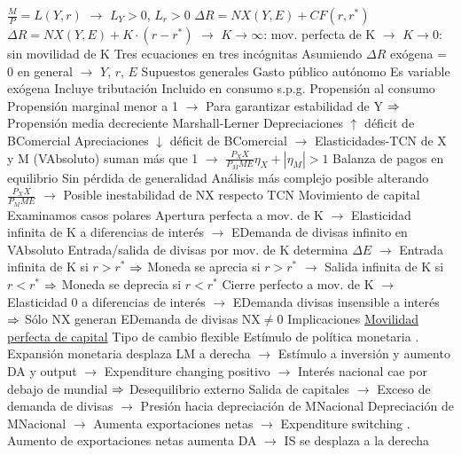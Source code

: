 \documentclass{nuevotema}
\begin{document}
\begin{esquemal}
				\4[LM] $\frac{M}{P} = L(Y,r)$
				\4[] $\to$ $L_Y > 0$, $L_r > 0$
				\4[BP] $\Delta R = NX(Y,E) + CF(r, r^*)$
				\4[] $\Delta R = NX(Y,E) + K \cdot (r- r^*)$
				\4[] $\to$ $K \to \infty$: mov. perfecta de K
				\4[] $\to$ $K \to 0$: sin movilidad de K
				\4 Tres ecuaciones en tres incógnitas
				\4[] Asumiendo $\Delta R$ exógena = 0 en general
				\4[] $\to$ $Y$, $r$, $E$
			\3 Supuestos generales
				\4 Gasto público autónomo
				\4[] Es variable exógena
				\4[] Incluye tributación
				\4[] Incluido en consumo s.p.g.
				\4 Propensión al consumo
				\4[] Propensión marginal menor a 1
				\4[] $\to$ Para garantizar estabilidad de Y
				\4[] $\Rightarrow$ Propensión media decreciente
				\4 Marshall-Lerner
				\4[] Depreciaciones $\uparrow$ déficit de BComercial
				\4[] Apreciaciones $\downarrow$ déficit de BComercial
				\4[] $\to$ Elasticidades-TCN de X y M (VAbsoluto) suman más que 1
				\4[] $\to$ $\frac{P_X X}{P_M M E} \eta_X + \left| \eta_M \right| > 1$
				\4 Balanza de pagos en equilibrio
				\4[] Sin pérdida de generalidad
				\4[] Análisis más complejo posible alterando $\frac{P_X X}{P_M M E}$
				\4[] $\to$ Posible inestabilidad de NX respecto TCN
				\4 Movimiento de capital
				\4[] Examinamos casos polares
				\4[] Apertura perfecta a mov. de K
				\4[] $\to$ Elasticidad infinita de K a diferencias de interés
				\4[] $\to$ EDemanda de divisas infinito en VAbsoluto
				\4[] Entrada/salida de divisas por mov. de K determina $\Delta E$
				\4[] $\to$ Entrada infinita de K si $r>r^*$
				\4[] $\Rightarrow$ Moneda se aprecia si $r > r^*$
				\4[] $\to$ Salida infinita de K si $r < r^*$
				\4[] $\Rightarrow$ Moneda se deprecia si $r < r^*$
				\4[] Cierre perfecto a mov. de K
				\4[] $\to$ Elasticidad 0 a diferencias de interés
				\4[] $\to$ EDemanda divisas insensible a interés
				\4[] $\Rightarrow$ Sólo NX generan EDemanda de divisas
				\4[] $\text{NX} \neq 0$
		\2 Implicaciones
			\3 \underline{Movilidad perfecta de capital}
			\3[] Tipo de cambio flexible
				\4 Estímulo de política monetaria
				. Expansión monetaria desplaza LM a derecha
				\4[] $\to$ Estímulo a inversión y aumento DA y output
				\4[] $\to$ Expenditure changing positivo
				\4[] $\to$ Interés nacional cae por debajo de mundial
				\4[] $\Rightarrow$ Desequilibrio externo
				\4[] Salida de capitales
				\4[] $\to$ Exceso de demanda de divisas
				\4[] $\to$ Presión hacia depreciación de MNacional
				\4[] Depreciación de MNacional
				\4[] $\to$ Aumenta exportaciones netas
				\4[] $\to$ Expenditure switching
				. Aumento de exportaciones netas aumenta DA
				\4[] $\to$ IS se desplaza a la derecha

\end{esquemal}
\end{document}
